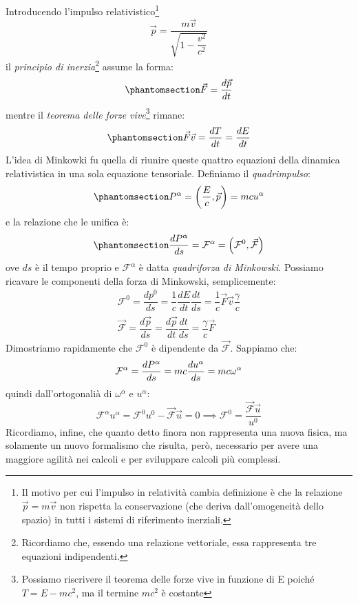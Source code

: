 Introducendo l'impulso relativistico\footnote{Il motivo per cui l'impulso in relatività cambia definizione è che la relazione $\Vec{p}=m\Vec{v}$ non rispetta la conservazione (che deriva dall'omogeneità dello spazio) in tutti i sistemi di riferimento inerziali.}
\begin{equation}
    \Vec{p}=\dfrac{m\Vec{v}}{\sqrt{1-\dfrac{v^2}{c^2}}}
\end{equation}
il \textit{principio di inerzia}\footnote{Ricordiamo che, essendo una relazione vettoriale, essa rappresenta tre equazioni indipendenti.} assume la forma:
\begin{equation}\phantomsection\label{eq:princ_iner}
    \Vec{F}=\dfrac{d\Vec{p}}{dt}
\end{equation}
mentre il \textit{teorema delle forze vive}\footnote{Possiamo riscrivere il teorema delle forze vive in funzione di E poiché $T=E-mc^2$, ma il termine $mc^2$ è costante} rimane:
\begin{equation}\phantomsection\label{eq:teo_for_vive}
    \Vec{F}\Vec{v}=\dfrac{dT}{dt}=\dfrac{dE}{dt}
\end{equation}
L'idea di Minkowki fu quella di riunire queste quattro equazioni della dinamica relativistica in una sola equazione tensoriale. Definiamo il \textit{quadrimpulso}:
\begin{equation}\phantomsection\label{eq:def_quadimpul}
    P^\alpha=\left(\dfrac{E}{c},\Vec{p}\right)=mcu^\alpha
\end{equation}
e la relazione che le unifica è:
\begin{equation}\phantomsection\label{eq:quad_for}
   \dfrac{dP^\alpha}{ds}=\mathcal{F}^\alpha=\left(\mathcal{F}^0,\Vec{\mathcal{F}}\right)
\end{equation}
ove $ds$ è il tempo proprio e $\mathcal{F}^\alpha$ è datta \textit{quadriforza di Minkowski}.
Possiamo ricavare le componenti della forza di Minkowski, semplicemente: 
\begin{gather*}
   \mathcal{F}^0=\dfrac{dp^0}{ds}=\dfrac{1}{c}\dfrac{dE}{dt}\dfrac{dt}{ds}=\dfrac{1}{c}\Vec{F}\Vec{v}\dfrac{\gamma}{c}\\
   \Vec{\mathcal{F}}=\dfrac{d\Vec{p}}{ds}=\dfrac{d\Vec{p}}{dt}\dfrac{dt}{ds}=\dfrac{\gamma}{c}\Vec{F}
\end{gather*}
Dimostriamo rapidamente che $\mathcal{F}^0$ è dipendente da $\Vec{\mathcal{F}}$. Sappiamo che:
\begin{equation*}
  \mathcal{F}^\alpha=\dfrac{dP^\alpha}{ds}=mc\dfrac{du^\alpha}{ds}=mc\omega^\alpha\\
  \end{equation*}
   quindi dall'ortogonalià di $\omega^\alpha$ e $u^\alpha$:
   \begin{equation*}
        \mathcal{F}^\alpha u^\alpha= \mathcal{F}^0u^0-\Vec{\mathcal{F}}\Vec{u}=0  \implies \mathcal{F}^0=\dfrac{\Vec{\mathcal{F}}\Vec{u}}{u^0} 
   \end{equation*}
   Ricordiamo, infine, che quanto detto finora non rappresenta una nuova fisica, ma solamente un nuovo formalismo che risulta, però, necessario per avere una maggiore agilità nei calcoli e per sviluppare calcoli più complessi.
